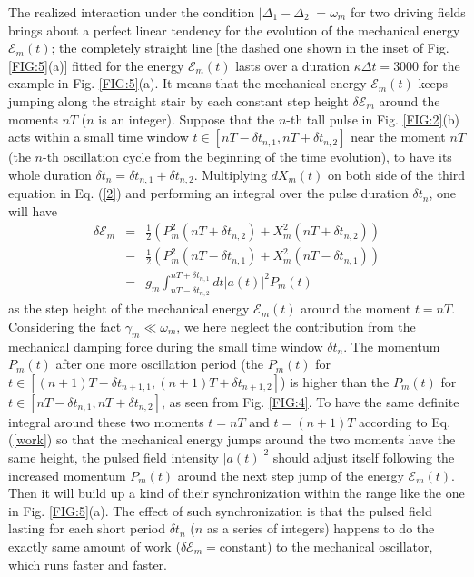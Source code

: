 \documentclass[a4paper,fleqn]{cas-dc}
\begin{document}
The realized interaction under the condition $|\Delta_1-\Delta_2|=\omega_m$ for two driving fields brings about a perfect linear tendency for the evolution of the mechanical energy $\mathcal{E}_m(t)$; the completely straight line [the dashed one shown in the inset of Fig. \ref{FIG:5}(a)] fitted for the energy $\mathcal{E}_m(t)$ lasts over a duration $\kappa \Delta t=3000$ for the example in Fig. \ref{FIG:5}(a). It means that the mechanical energy $\mathcal{E}_m(t)$ keeps jumping along the straight stair by each constant step height $\delta\mathcal{E}_m$ around the moments $nT$ ($n$ is an integer).
Suppose that the $n$-th tall pulse in Fig. \ref{FIG:2}(b) acts within a small time window $t\in [nT-\delta t_{n,1},nT+\delta t_{n,2}]$ near the moment $nT$ (the $n$-th oscillation cycle from the beginning of the time evolution), to have its whole duration $\delta t_n=\delta t_{n,1}+\delta t_{n,2}$. Multiplying $dX_m(t)$ on both side of the third equation in Eq. (\ref{2}) and performing an integral over the pulse duration $\delta t_n$, one will have 
\begin{eqnarray}
\delta\mathcal{E}_m&=&\frac{1}{2}\left(P^2_m(nT+\delta t_{n,2})+X^2_m(nT+\delta t_{n,2})\right)\nonumber\\
&-&\frac{1}{2}\left(P^2_m(nT-\delta t_{n,1})+X^2_m(nT-\delta t_{n,1})\right)\nonumber\\
&=&g_m\int_{nT-\delta t_{n,2}}^{nT+\delta t_{n,1}}dt |a(t)|^2P_m(t)
\label{work}
\end{eqnarray}
as the step height of the mechanical energy $\mathcal{E}_m(t)$ around the moment $t=nT$. 
Considering the fact $\gamma_m\ll \omega_m$, we here neglect the contribution from the mechanical damping force during the small time window $\delta t_n$. The momentum $P_m(t)$ after one more oscillation period (the $P_m(t)$ for $t\in [(n+1)T-\delta t_{n+1,1},(n+1)T+\delta t_{n+1,2}]$) is higher than the $P_m(t)$ for $t\in [nT-\delta t_{n,1},nT+\delta t_{n,2}]$, as seen from Fig. \ref{FIG:4}. To have the same definite integral around these two moments $t=nT$ and $t=(n+1)T$ according to Eq. (\ref{work}) so that the mechanical energy jumps around the two moments have the same height, the pulsed field intensity $|a(t)|^2$ should adjust itself following the increased momentum $P_m(t)$ around the next step jump of the energy $\mathcal{E}_m(t)$. Then it will build up a kind of their synchronization within the range like the one in Fig. \ref{FIG:5}(a). The effect of such synchronization is that the pulsed field lasting for each short period $\delta t_n$ ($n$ as a series of integers) happens to do the exactly same amount of work ($\delta\mathcal{E}_m=\text{constant}$) to the mechanical oscillator, which runs faster and faster. 
\end{document}

